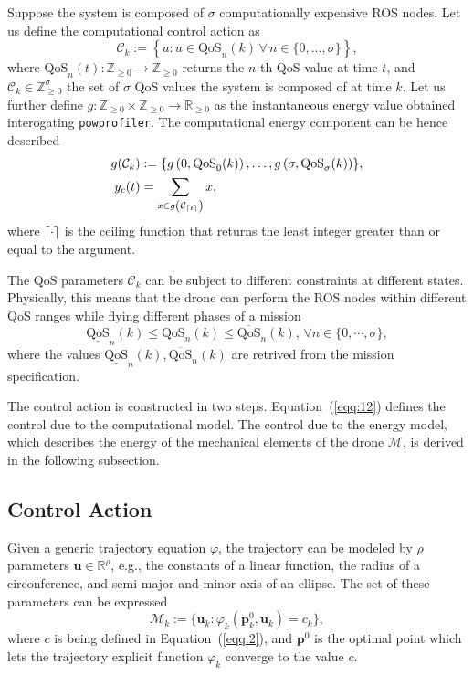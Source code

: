 \documentclass[letterpaper,10pt,conference]{ieeeconf}
\newcommand{\stt}[1]{{\small\tt #1}} %
\newcommand{\powprof}{\stt{powprofiler}}
\DeclarePairedDelimiter{\ceil}{\lceil}{\rceil}
\begin{document}
Suppose the system is composed of $\sigma$ computationally expensive ROS nodes. Let us define the computational control action as
\begin{equation}\label{eqq:12}
  \mathcal{C}_k:=\left\{u:u\in\text{QoS}_n(k)\,\forall\,n\in\{0,\dots,\sigma\}\right\},
\end{equation}
where $\text{QoS}_n(t):\mathbb{Z}_{\geq 0}\rightarrow\mathbb{Z}_{\geq 0}$ returns the $n$-th QoS value at time $t$, and $\mathcal{C}_k\in\mathbb{Z}_{\geq 0}^\sigma$ the set of $\sigma$ QoS values the system is composed of at time $k$. Let us further define $g:\mathbb{Z}_{\geq 0}\times\mathbb{Z}_{\geq 0}\rightarrow\mathbb{R}_{\geq 0}$ as the instantaneous energy value obtained interogating \powprof{}. The computational energy component can be hence described
\begin{equation}\begin{split}
  g(\mathcal{C}_{k})&:=\{g\left(0,\text{QoS}_0(k)\right),\dots,g\left(\sigma,\text{QoS}_\sigma(k)\right)\},\\
  y_c(t)&=\sum_{x\in g\left(\mathcal{C}_{\ceil{t}}\right)}{x},
\end{split}\end{equation}
where $\ceil{\cdot}$ is the ceiling function that returns the least integer greater than or equal to the argument.

The QoS parameters $\mathcal{C}_k$ can be subject to different constraints at different states. Physically, this means that the drone can perform the ROS nodes within different QoS ranges while flying different phases of a mission
\begin{equation}\label{eqq:14}
  \underline{\text{QoS}}_n(k)\leq \text{QoS}_n(k)\leq \overline{\text{QoS}}_n(k),\,\forall n\in\{0,\cdots,\sigma\},
\end{equation}
where the values $\underline{\text{QoS}}_n(k),\overline{\text{QoS}}_n(k)$ are retrived from the mission specification.

The control action is constructed in two steps. Equation~(\ref{eqq:12}) defines the control due to the computational model. The control due to the energy model, which describes the energy of the mechanical elements of the drone $\mathcal{M}$, is derived in the following subsection.

\subsection{Control Action}

Given a generic trajectory equation $\varphi$, the trajectory can be modeled by $\rho$ parameters $\mathbf{u}\in\mathbb{R}^\rho$, e.g., the constants of a linear function, the radius of a circonference, and semi-major and minor axis of an ellipse. The set of these parameters can be expressed
\begin{equation}\label{eqq:14}
  \mathcal{M}_k:=\{\mathbf{u}_k : \varphi_k(\mathbf{p}_k^0,\mathbf{u}_k)=c_k\},
\end{equation}
where $c$ is being defined in Equation~(\ref{eqq:2}), and $\mathbf{p}^0$ is the optimal point which lets the trajectory explicit function $\varphi_k$ converge to the value $c$. 
\end{document}
